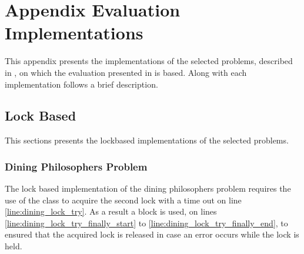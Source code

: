 \chapter[]{Appendix Evaluation Implementations}
This appendix presents the implementations of the selected problems, described in , on which the evaluation presented in  is based. Along with each implementation follows a brief description.
\label{app:eval_implementations}

\section{Lock Based}\label{app:impl_lockbased}
This sections presents the lockbased implementations of the selected problems.

\subsection{Dining Philosophers Problem}
The lock based implementation of the dining philosophers problem requires the use of the  class to acquire the second lock with a time out on line \ref{line:dining_lock_try}. As a result a  block is used, on lines \ref{line:dining_lock_try_finally_start} to \ref{line:dining_lock_try_finally_end}, to ensured that the acquired lock is released in case an error occurs while the lock is held.
